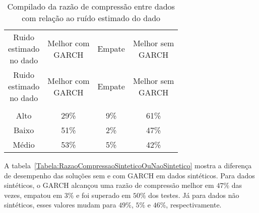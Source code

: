  \begin{center}
\begin{longtable}{cccc}
\toprule
\rowcolor{white}
 \caption{Compilado da razão de compressão entre dados com relação ao ruído
 estimado do dado}\label{Tabela:RazaoCompressaoRuidoEstimado} \\
\midrule
\rowcolor{white}
   \specialcell{Ruido\\estimado\\no dado} & \specialcell{Melhor com\\GARCH} &
   Empate & \specialcell{Melhor sem\\GARCH} \\
\midrule
\endfirsthead
\midrule
\rowcolor{white}
   \specialcell{Ruido\\estimado\\no dado} & \specialcell{Melhor com\\GARCH} &
   Empate & \specialcell{Melhor sem\\GARCH} \\
\toprule
\endhead
\midrule \\ %
\endfoot
\bottomrule
\endlastfoot
    Alto & 29\%  & 9\%   & 61\% \\
	Baixo & 51\%  & 2\%   & 47\% \\
	Médio & 53\%  & 5\%   & 42\% \\
\end{longtable}
\end{center}

 
A tabela~\ref{Tabela:RazaoCompressaoSinteticoOuNaoSintetico} mostra a diferença
de desempenho das soluções sem e com GARCH em dados sintéticos. Para dados
sintéticos, o GARCH alcançou uma razão de compressão melhor em $47\%$ das vezes,
empatou em $3\%$ e foi superado em $50\%$ dos testes. Já para dados não
sintéticos, esses valores mudam para $49\%$, $5\%$ e $46\%$, respectivamente.

